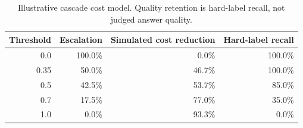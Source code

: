 \begin{table}[H]
\centering
\footnotesize
\caption{Illustrative cascade cost model. Quality retention is hard-label recall, not judged answer quality.}
\label{tab:cascade}
\begin{tabular}{|r|r|r|r|}
\hline
Threshold & Escalation & Simulated cost reduction & Hard-label recall \\ \hline
0.0 & 100.0\% & 0.0\% & 100.0\% \\ \hline
0.35 & 50.0\% & 46.7\% & 100.0\% \\ \hline
0.5 & 42.5\% & 53.7\% & 85.0\% \\ \hline
0.7 & 17.5\% & 77.0\% & 35.0\% \\ \hline
1.0 & 0.0\% & 93.3\% & 0.0\% \\ \hline
\end{tabular}
\end{table}
